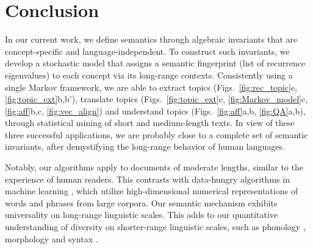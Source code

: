 \documentclass[10pt,journal,compsoc]{IEEEtran}
\begin{document}




\section{Conclusion}
In our current work, we  define semantics through algebraic invariants that are concept-specific and language-independent. To construct such invariants, we develop a stochastic model %
that assigns a semantic fingerprint (list of recurrence eigenvalues) to each
concept via its long-range contexts. Consistently using a  single  Markov framework,  we are able  to     extract topics (Figs.~\ref{fig:rec_topic}e, \ref{fig:topic_ext}b,b'), translate topics (Figs.~\ref{fig:topic_ext}c, \ref{fig:Markov_model}c, \ref{fig:aff}b,c, \ref{fig:vec_align}) and understand topics (Figs.~\ref{fig:aff}a,b,  \ref{fig:QA}a,b), through statistical mining of short and medium-length texts.  In view of these three successful applications, we are probably close to a complete set of semantic invariants, after demystifying the long-range behavior of human languages.

Notably, our algorithms apply to documents of moderate lengths, similar to  the experience of  human readers. This contrasts with data-hungry algorithms in machine learning \cite{WikiQA,Tshitoyan2019}, which utilize high-dimensional numerical representations of words and phrases \cite{NIPS2013word2vec,Arora2016,Joulin2018,Chen2018} from large corpora. Our  semantic mechanism exhibits universality on long-range linguistic scales. This adds to our quantitative understanding of diversity on shorter-range linguistic scales, such as phonology \cite{NowakKrakauer1999,EBR2015,Everett2017}, morphology \cite{Pinker1997WordsRules,MarslenWilson1997,Lieberman2007,Newberry2017} and  syntax \cite{PinkerSurv2000,NowakPlotkinJansen2000,Chomsky2002syntactic,DunnGreenhillLevinsonGray2011,Newberry2017}.
\end{document}
